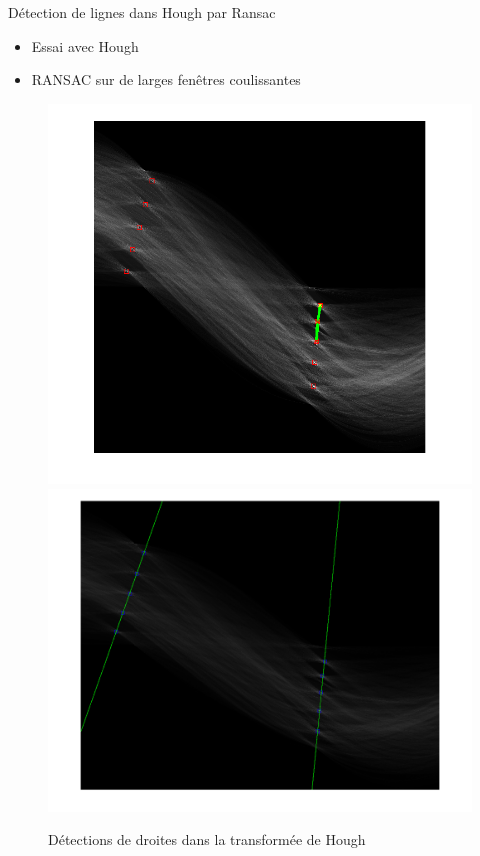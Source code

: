 \begin{frame}{Détection de lignes dans Hough par Ransac}
\begin{itemize}
\item Essai avec Hough
\item RANSAC sur de larges fenêtres coulissantes
\end{itemize}
\begin{figure}
\begin{center}
\includegraphics[scale=0.238]{fig/houghlineshough.png}
\includegraphics[scale=0.2]{fig/houghlinesRANSAC.png}
\end{center}
\caption{\label{houghlines}Détections de droites dans la transformée de Hough}
\end{figure}
\end{frame}

